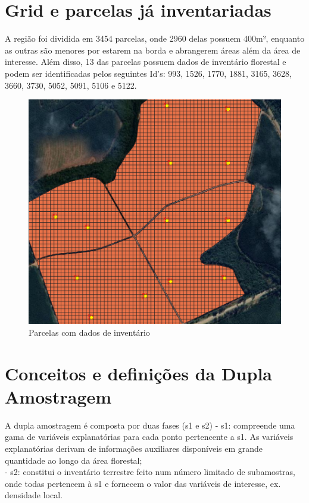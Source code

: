 \documentclass[
]{article}
\begin{document}
\newpage

\section{Grid e parcelas já
inventariadas}\label{grid-e-parcelas-juxe1-inventariadas}

A região foi dividida em 3454 parcelas, onde 2960 delas possuem 400m²,
enquanto as outras são menores por estarem na borda e abrangerem áreas
além da área de interesse. Além disso, 13 das parcelas possuem dados de
inventário florestal e podem ser identificadas pelos seguintes Id's:
993, 1526, 1770, 1881, 3165, 3628, 3660, 3730, 5052, 5091, 5106 e 5122.

\begin{figure}

{\centering \includegraphics[width=0.4\linewidth]{IMAGES/parcelasinventariadas} 

}

\caption{Parcelas com dados de inventário}\label{fig:unnamed-chunk-5}
\end{figure}
\newpage

\section{Conceitos e definições da Dupla
Amostragem}\label{conceitos-e-definiuxe7uxf5es-da-dupla-amostragem}

A dupla amostragem é composta por duas fases (s1 e s2) - s1: compreende
uma gama de variáveis explanatórias para cada ponto pertencente a s1. As
variáveis explanatórias derivam de informações auxiliares disponíveis em
grande quantidade ao longo da área florestal;\\
- s2: constitui o inventário terrestre feito num número limitado de
subamostras, onde todas pertencem à s1 e fornecem o valor das variáveis
de interesse, ex. densidade local.
\end{document}
